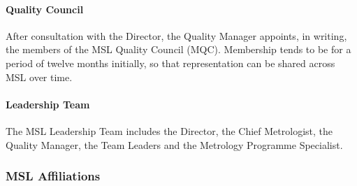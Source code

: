 \paragraph{Quality Council}
After consultation with the Director, the Quality Manager appoints, in writing, the members of the MSL Quality Council (MQC). Membership tends to be for a period of twelve months initially, so that representation can be shared across MSL over time.

\paragraph{Leadership Team}
The MSL Leadership Team includes the Director, the Chief Metrologist, the Quality Manager, the 
Team Leaders and the Metrology Programme Specialist. 

\subsubsection{MSL Affiliations}
\label{sss:affiliations}

